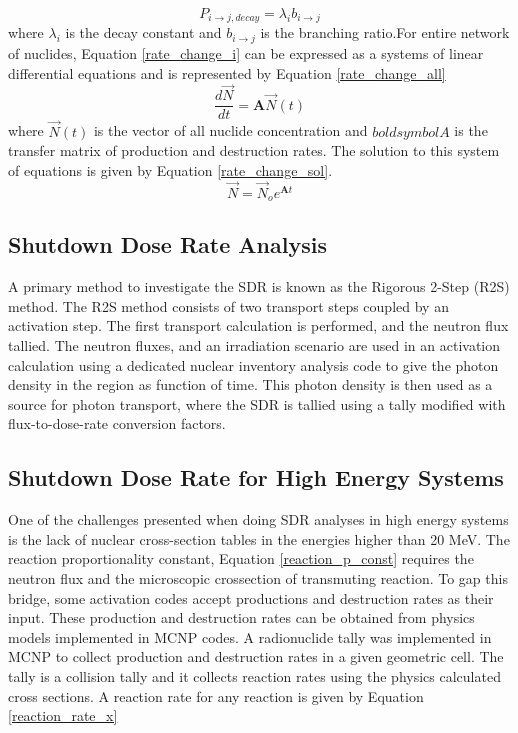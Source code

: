 \begin{equation}\label{decay_p_const}
  P_{i \rightarrow j, decay} = \lambda_{i} b_{i \rightarrow j}
\end{equation}
where $\lambda_{i}$ is the decay constant and $b_{i \rightarrow j}$ is
the branching ratio.For entire network of nuclides,
Equation \ref{rate_change_i} can be expressed as
a systems of linear differential equations and is represented by Equation
\ref{rate_change_all}
\begin{equation}\label{rate_change_all}
  \frac{d\vec{N}}{dt} =\boldsymbol{A}  \vec{N}(t)
\end{equation}
where $\vec{N}(t)$ is the vector of all nuclide concentration and $boldsymbol{A}$
is the transfer matrix of production and destruction rates. The solution to this
system of equations is given by Equation \ref{rate_change_sol}.
\begin{equation}\label{rate_change_sol}
  \vec{N} =\vec{N}_{o} e^{\boldsymbol{A}t}
\end{equation}


\subsection{Shutdown Dose Rate Analysis}

A primary method to investigate the SDR is known as the
Rigorous 2-Step (R2S) method. The R2S method consists of two transport steps
coupled by an activation step. 
The first transport calculation is performed, and the neutron flux tallied.
The neutron fluxes, and an irradiation scenario are used in an activation
calculation using a dedicated nuclear inventory analysis code to give the 
photon density in the region as function of time. 
This photon density is then used as a source for photon transport,
where the SDR is tallied using a tally modified with flux-to-dose-rate
conversion factors.

\subsection{Shutdown Dose Rate for High Energy Systems}
One of the challenges presented when doing SDR analyses in high energy systems is the 
lack of nuclear cross-section tables in the energies higher than 20 MeV. 
The reaction proportionality constant, Equation \ref{reaction_p_const}
requires the neutron flux and the microscopic crossection of transmuting reaction. 
To gap this bridge, some activation codes accept productions and destruction rates
as their input. These production and destruction rates can be obtained from
physics models implemented in MCNP codes.
A radionuclide tally was implemented in MCNP to collect production and destruction
rates in a given geometric cell. The tally is a collision tally and
it collects reaction rates using the physics calculated
cross sections. A reaction rate for any reaction is given by Equation
\ref{reaction_rate_x}

